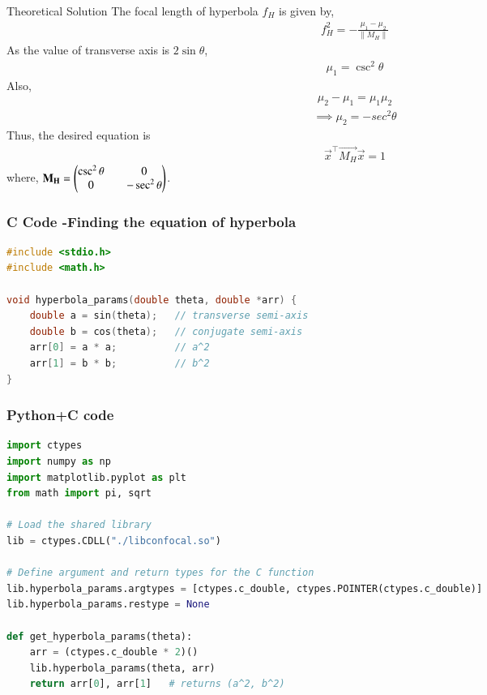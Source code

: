 \documentclass{beamer}
\begin{document}
\begin{frame}{Theoretical Solution}
The focal length of hyperbola $f_H$ is given by,
\begin{align}
    f_H^2=-\frac{\mu_1-\mu_2}{\|M_H\|}
\end{align}
As the value of transverse axis is $2\sin{\theta}$,
\begin{align}
    \mu_1=\csc^2{\theta}
\end{align}
Also,
\begin{align}
    \mu_2-\mu_1=\mu_1\mu_2
\end{align}
\begin{align}
    \implies \mu_2=-sec^2{\theta}
\end{align}
Thus, the desired equation is
\begin{align}
    \vec{x}^{\top}\vec{M_H}\vec{x}=1
\end{align}
where, $\mathbf{M_H}=\begin{pmatrix}\csc^2{\theta}&&0\\0&&-\sec^2{\theta}\end{pmatrix}$.
\end{frame}

\begin{frame}[fragile]
    \frametitle{C Code -Finding the equation of hyperbola}

    \begin{lstlisting}[language=C]
#include <stdio.h>
#include <math.h>

void hyperbola_params(double theta, double *arr) {
    double a = sin(theta);   // transverse semi-axis
    double b = cos(theta);   // conjugate semi-axis
    arr[0] = a * a;          // a^2
    arr[1] = b * b;          // b^2
}
    \end{lstlisting}
\end{frame}



\begin{frame}[fragile]
    \frametitle{Python+C code}

    \begin{lstlisting}[language=Python]
import ctypes
import numpy as np
import matplotlib.pyplot as plt
from math import pi, sqrt

# Load the shared library
lib = ctypes.CDLL("./libconfocal.so")

# Define argument and return types for the C function
lib.hyperbola_params.argtypes = [ctypes.c_double, ctypes.POINTER(ctypes.c_double)]
lib.hyperbola_params.restype = None

def get_hyperbola_params(theta):
    arr = (ctypes.c_double * 2)()
    lib.hyperbola_params(theta, arr)
    return arr[0], arr[1]   # returns (a^2, b^2)

    \end{lstlisting}
\end{frame}
\end{document}
